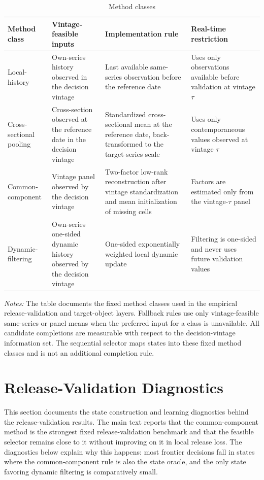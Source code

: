 \documentclass[a4paper,12pt]{article}
\newcommand{\1}{\mathbf{1}}
\newcommand{\ExhibitNote}[1]{\begin{minipage}{0.94\textwidth}\footnotesize\emph{Notes:} #1\end{minipage}}
\begin{document}
\begin{table}[H]
\centering
\caption{Method classes}
\label{tab:ia_procedure_classes}
\small
\begin{adjustbox}{max width=\textwidth}
\begin{tabular}{@{}P{0.20\textwidth}P{0.25\textwidth}P{0.29\textwidth}P{0.20\textwidth}@{}}
\toprule
Method class & Vintage-feasible inputs & Implementation rule & Real-time restriction \\
\midrule
Local-history & Own-series history observed in the decision vintage & Last available same-series observation before the reference date & Uses only observations available before validation at vintage $\tau$ \\
Cross-sectional pooling & Cross-section observed at the reference date in the decision vintage & Standardized cross-sectional mean at the reference date, back-transformed to the target-series scale & Uses only contemporaneous values observed at vintage $\tau$ \\
Common-component & Vintage panel observed by the decision vintage & Two-factor low-rank reconstruction after vintage standardization and mean initialization of missing cells & Factors are estimated only from the vintage-$\tau$ panel \\
Dynamic-filtering & Own-series one-sided dynamic history observed by the decision vintage & One-sided exponentially weighted local dynamic update & Filtering is one-sided and never uses future validation values \\
\bottomrule
\end{tabular}
\end{adjustbox}
\par\medskip
\ExhibitNote{The table documents the fixed method classes used in the empirical release-validation and target-object layers. Fallback rules use only vintage-feasible same-series or panel means when the preferred input for a class is unavailable. All candidate completions are measurable with respect to the decision-vintage information set. The sequential selector maps states into these fixed method classes and is not an additional completion rule.}
\end{table}

\section{Release-Validation Diagnostics}
\label{ia:release_validation_diagnostics}

This section documents the state construction and learning diagnostics behind the release-validation results. The main text reports that the common-component method is the strongest fixed release-validation benchmark and that the feasible selector remains close to it without improving on it in local release loss. The diagnostics below explain why this happens: most frontier decisions fall in states where the common-component rule is also the state oracle, and the only state favoring dynamic filtering is comparatively small.
\end{document}
